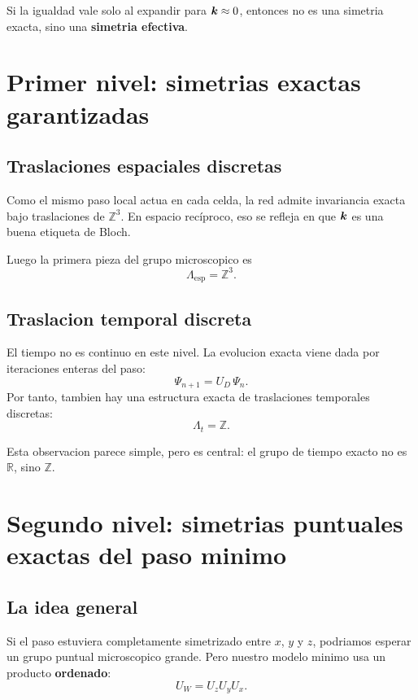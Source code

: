 Si la igualdad vale solo al expandir para \(\bm{k}\approx 0\), entonces no es una simetria exacta, sino una \textbf{simetria efectiva}.

\section{Primer nivel: simetrias exactas garantizadas}
\subsection{Traslaciones espaciales discretas}
Como el mismo paso local actua en cada celda, la red admite invariancia exacta bajo traslaciones de \(\mathbb{Z}^3\). En espacio recíproco, eso se refleja en que \(\bm{k}\) es una buena etiqueta de Bloch.

Luego la primera pieza del grupo microscopico es
\begin{equation}
\Lambda_{\mathrm{esp}}=\mathbb{Z}^3.
\end{equation}

\subsection{Traslacion temporal discreta}
El tiempo no es continuo en este nivel. La evolucion exacta viene dada por iteraciones enteras del paso:
\begin{equation}
\Psi_{n+1}=U_D\,\Psi_n.
\end{equation}
Por tanto, tambien hay una estructura exacta de traslaciones temporales discretas:
\begin{equation}
\Lambda_t=\mathbb{Z}.
\end{equation}

Esta observacion parece simple, pero es central: el grupo de tiempo exacto no es \(\mathbb{R}\), sino \(\mathbb{Z}\).

\section{Segundo nivel: simetrias puntuales exactas del paso minimo}
\subsection{La idea general}
Si el paso estuviera completamente simetrizado entre \(x\), \(y\) y \(z\), podriamos esperar un grupo puntual microscopico grande. Pero nuestro modelo minimo usa un producto \textbf{ordenado}:
\[
U_W=U_zU_yU_x.
\]

